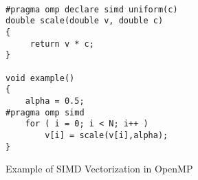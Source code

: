 \begin{figure}
\begin{verbatim}

#pragma omp declare simd uniform(c)
double scale(double v, double c)
{
     return v * c;
}

void example()
{
    alpha = 0.5;
#pragma omp simd 
    for ( i = 0; i < N; i++ )
        v[i] = scale(v[i],alpha);
}

\end{verbatim}
\caption{Example of SIMD Vectorization in OpenMP}
\label{fig:simd-example}
\end{figure}



